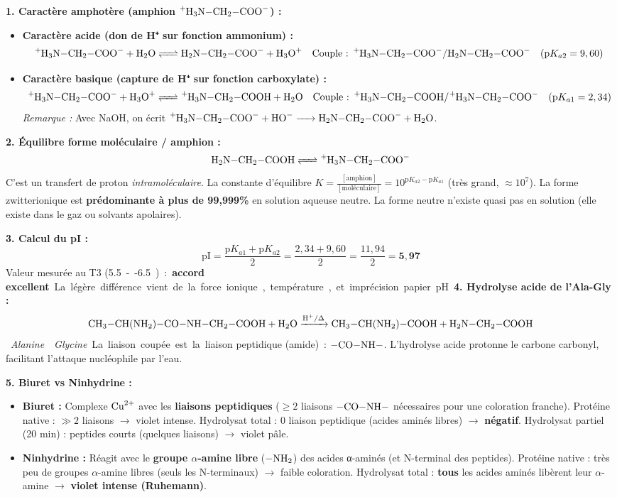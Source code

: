 \documentclass[11pt]{article}
\newcommand{\cle}[1]{{\popxbold\color{popdark}#1}}
\begin{document}
\begin{exoresolu}
\textbf{1. Caractère amphotère (amphion $\ce{^{+}H3N-CH2-COO-}$) :}
\begin{itemize}
    \item \textbf{Caractère acide (don de H⁺ sur fonction ammonium) :}
    \[ \ce{^{+}H3N-CH2-COO- + H2O <=> H2N-CH2-COO- + H3O+} \quad \text{Couple : } \ce{^{+}H3N-CH2-COO-}/\ce{H2N-CH2-COO-} \quad (\text{p}K_{a2} = 9,60) \]
    \item \textbf{Caractère basique (capture de H⁺ sur fonction carboxylate) :}
    \[ \ce{^{+}H3N-CH2-COO- + H3O+ <=> ^{+}H3N-CH2-COOH + H2O} \quad \text{Couple : } \ce{^{+}H3N-CH2-COOH}/\ce{^{+}H3N-CH2-COO-} \quad (\text{p}K_{a1} = 2,34) \]
    \emph{Remarque :} Avec NaOH, on écrit $\ce{^{+}H3N-CH2-COO- + HO- -> H2N-CH2-COO- + H2O}$.
\end{itemize}

\textbf{2. Équilibre forme moléculaire / amphion :}
\[ \ce{H2N-CH2-COOH <=> ^{+}H3N-CH2-COO-} \]
C'est un transfert de proton \emph{intramoléculaire}. La constante d'équilibre $K = \frac{[\text{amphion}]}{[\text{moléculaire}]} = 10^{\text{p}K_{a2} - \text{p}K_{a1}}$ (très grand, $\approx 10^{7}$). La forme zwitterionique est \textbf{prédominante à plus de 99,999\%} en solution aqueuse neutre. La forme neutre n'existe quasi pas en solution (elle existe dans le gaz ou solvants apolaires).

\textbf{3. Calcul du pI :}
\[ \text{pI} = \frac{\text{p}K_{a1} + \text{p}K_{a2}}{2} = \frac{2,34 + 9,60}{2} = \frac{11,94}{2} = \mathbf{5,97} \]
Valeur mesurée au T3 (\SI{5,5}{--}\SI{6,5}) : \textbf{accord excellent}. La légère différence vient de la force ionique, température, et imprécision papier pH.

\textbf{4. Hydrolyse acide de l'Ala-Gly :}
\[ \ce{CH3-CH(NH2)-CO-NH-CH2-COOH + H2O ->[H+/\Delta] CH3-CH(NH2)-COOH + H2N-CH2-COOH} \]
\emph{Alanine} \quad \emph{Glycine}
La liaison coupée est la \cle{liaison peptidique (amide)} : $\ce{-CO-NH-}$. L'hydrolyse acide protonne le carbone carbonyl, facilitant l'attaque nucléophile par l'eau.

\textbf{5. Biuret vs Ninhydrine :}
\begin{itemize}
    \item \textbf{Biuret :} Complexe $\ce{Cu^{2+}}$ avec les \textbf{liaisons peptidiques} ($\ge 2$ liaisons $\ce{-CO-NH-}$ nécessaires pour une coloration franche). Protéine native : $\gg 2$ liaisons $\to$ violet intense. Hydrolysat total : 0 liaison peptidique (acides aminés libres) $\to$ \textbf{négatif}. Hydrolysat partiel (20 min) : peptides courts (quelques liaisons) $\to$ violet pâle.
    \item \textbf{Ninhydrine :} Réagit avec le \textbf{groupe $\alpha$-amine libre} ($\ce{-NH2}$) des acides α-aminés (et N-terminal des peptides). Protéine native : très peu de groupes $\alpha$-amine libres (seuls les N-terminaux) $\to$ faible coloration. Hydrolysat total : \textbf{tous} les acides aminés libèrent leur $\alpha$-amine $\to$ \textbf{violet intense (Ruhemann)}.
\end{itemize}


\end{exoresolu}
\end{document}
